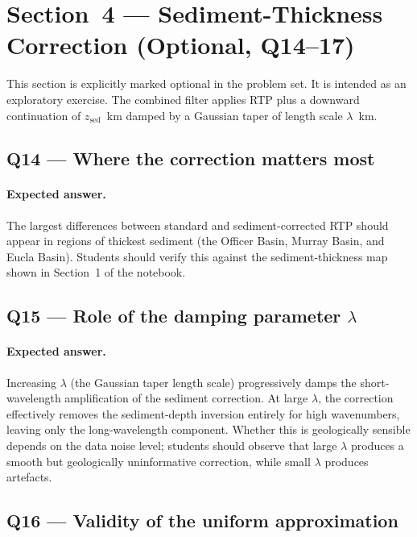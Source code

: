 \documentclass[11pt]{article}
\begin{document}
\section{Section~4 — Sediment-Thickness Correction (Optional, Q14--17)}

This section is explicitly marked optional in the problem set.  It is intended as
an exploratory exercise.  The combined filter applies RTP plus a downward
continuation of $z_\mathrm{sed}$~km damped by a Gaussian taper of length scale
$\lambda$~km.

\subsection*{Q14 — Where the correction matters most}

\paragraph{Expected answer.}
The largest differences between standard and sediment-corrected RTP should appear
in regions of thickest sediment (the Officer Basin, Murray Basin, and Eucla
Basin).  Students should verify this against the sediment-thickness map shown in
Section~1 of the notebook.

\subsection*{Q15 — Role of the damping parameter $\lambda$}

\paragraph{Expected answer.}
Increasing $\lambda$ (the Gaussian taper length scale) progressively damps the
short-wavelength amplification of the sediment correction.  At large $\lambda$,
the correction effectively removes the sediment-depth inversion entirely for
high wavenumbers, leaving only the long-wavelength component.  Whether this is
geologically sensible depends on the data noise level; students should observe
that large $\lambda$ produces a smooth but geologically uninformative correction,
while small $\lambda$ produces artefacts.

\subsection*{Q16 — Validity of the uniform approximation}
\end{document}
